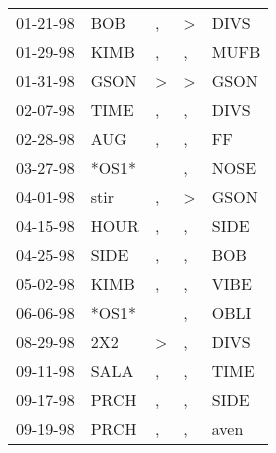 \begin{supertabular}{p{0.07\textwidth}p{0.06\textwidth}p{0.02\textwidth}p{0.02\textwidth}p{0.06\textwidth}}
 01-21-98\textsuperscript{} &            BOB\textsuperscript{} &             , &  \textgreater &           DIVS\textsuperscript{} \\
 01-29-98\textsuperscript{} &           KIMB\textsuperscript{} &             , &             , &           MUFB\textsuperscript{} \\
 01-31-98\textsuperscript{} &           GSON\textsuperscript{} &  \textgreater &  \textgreater &           GSON\textsuperscript{} \\
 02-07-98\textsuperscript{} &           TIME\textsuperscript{} &             , &             , &           DIVS\textsuperscript{} \\
 02-28-98\textsuperscript{} &            AUG\textsuperscript{} &             , &             , &             FF\textsuperscript{} \\
 03-27-98\textsuperscript{} &                            *OS1* &               &             , &           NOSE\textsuperscript{} \\
 04-01-98\textsuperscript{} &           stir\textsuperscript{} &             , &  \textgreater &           GSON\textsuperscript{} \\
 04-15-98\textsuperscript{} &           HOUR\textsuperscript{} &             , &             , &           SIDE\textsuperscript{} \\
 04-25-98\textsuperscript{} &           SIDE\textsuperscript{} &             , &             , &            BOB\textsuperscript{} \\
 05-02-98\textsuperscript{} &           KIMB\textsuperscript{} &             , &             , &           VIBE\textsuperscript{} \\
 06-06-98\textsuperscript{} &                            *OS1* &               &             , &           OBLI\textsuperscript{} \\
 08-29-98\textsuperscript{} &            2X2\textsuperscript{} &  \textgreater &             , &           DIVS\textsuperscript{} \\
 09-11-98\textsuperscript{} &           SALA\textsuperscript{} &             , &             , &           TIME\textsuperscript{} \\
 09-17-98\textsuperscript{} &           PRCH\textsuperscript{} &             , &             , &           SIDE\textsuperscript{} \\
 09-19-98\textsuperscript{} &           PRCH\textsuperscript{} &             , &             , &           aven\textsuperscript{} \\

\end{supertabular}

